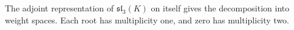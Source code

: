 \begin{example}
    The adjoint representation of $\mathfrak{sl}_3(K)$ on itself gives the decomposition into weight spaces. Each root has multiplicity one, and zero has multiplicity two.
\end{example}

\begin{comment}

\chapter{OA}

\begin{center}
    \begin{tikzpicture}[scale=1.5]
    \filldraw (0,0) circle (1pt);

    \draw[->,thick] (0,0) -- (0:1.4142);
    \node[anchor = west] at (0:1.4142) {$\alpha_{12}$};
    \draw[->,thick] (0,0) -- (60:1.4142);
    \node[anchor = south west] at (60:1.4142) {$\alpha_{13}$};
    \draw[->,thick] (0,0) -- (120:1.4142);
    \node[anchor = south] at (120:1.4142) {$\alpha_{23}$};
    \draw[->,thick] (0,0) -- (180:1.4142);
    \node[anchor = south east] at (180:1.4142) {$\alpha_{21}$};
    \draw[->,thick] (0,0) -- (240:1.4142);
    \node[anchor = north east] at (240:1.4242) {$\alpha_{31}$};
    \draw[->,thick] (0,0) -- (300:1.4142);
    \node[anchor = north west] at (300:1.4242) {$\alpha_{32}$};
    \draw[->,thick] (0,0) -- (30:0.816);
    \node[anchor = west] at (30:0.816) {$\varepsilon_1$};
    \draw[->,thick] (0,0) -- (90:0.816);
    \node[anchor = south] at (90:0.816) {$-\varepsilon_3$};
    \draw[->,thick] (0,0) -- (150:0.816);
    \node[anchor = east] at (150:0.816) {$\varepsilon_2$};
    \draw[->,thick] (0,0) -- (210:0.816);
    \node[anchor = north east] at (210:0.816) {$-\varepsilon_3$};
    \draw[->,thick] (0,0) -- (270:0.816);
    \node[anchor = north] at (270:0.816) {$\varepsilon_3$};
    \draw[->,thick] (0,0) -- (330:0.816);
    \node[anchor = north west] at (330:0.816) {$-\varepsilon_2$};
  \end{tikzpicture}
  \end{center}

\chapter{Real Forms}

A complex Lie algebra $\mathfrak{g}$ is {\bf reductive} if there is a 

\end{comment}


